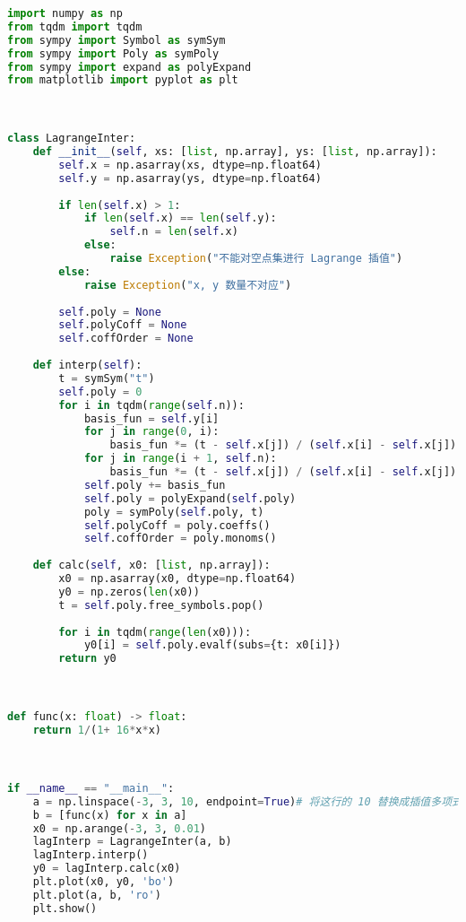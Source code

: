 \begin{lstlisting}[language=python]
import numpy as np
from tqdm import tqdm
from sympy import Symbol as symSym
from sympy import Poly as symPoly
from sympy import expand as polyExpand
from matplotlib import pyplot as plt



class LagrangeInter:
    def __init__(self, xs: [list, np.array], ys: [list, np.array]):
        self.x = np.asarray(xs, dtype=np.float64)
        self.y = np.asarray(ys, dtype=np.float64)
        
        if len(self.x) > 1:
            if len(self.x) == len(self.y):
                self.n = len(self.x)
            else:
                raise Exception("不能对空点集进行 Lagrange 插值")
        else:
            raise Exception("x, y 数量不对应")
        
        self.poly = None
        self.polyCoff = None
        self.coffOrder = None
    
    def interp(self):
        t = symSym("t")
        self.poly = 0
        for i in tqdm(range(self.n)):
            basis_fun = self.y[i]
            for j in range(0, i):
                basis_fun *= (t - self.x[j]) / (self.x[i] - self.x[j])
            for j in range(i + 1, self.n):
                basis_fun *= (t - self.x[j]) / (self.x[i] - self.x[j])
            self.poly += basis_fun
            self.poly = polyExpand(self.poly)
            poly = symPoly(self.poly, t)
            self.polyCoff = poly.coeffs()
            self.coffOrder = poly.monoms()
    
    def calc(self, x0: [list, np.array]):
        x0 = np.asarray(x0, dtype=np.float64)
        y0 = np.zeros(len(x0))
        t = self.poly.free_symbols.pop()
        
        for i in tqdm(range(len(x0))):
            y0[i] = self.poly.evalf(subs={t: x0[i]})
        return y0



def func(x: float) -> float:
    return 1/(1+ 16*x*x)



if __name__ == "__main__":
    a = np.linspace(-3, 3, 10, endpoint=True)# 将这行的 10 替换成插值多项式的选点数量（即阶数）
    b = [func(x) for x in a]
    x0 = np.arange(-3, 3, 0.01)
    lagInterp = LagrangeInter(a, b)
    lagInterp.interp()
    y0 = lagInterp.calc(x0)
    plt.plot(x0, y0, 'bo')
    plt.plot(a, b, 'ro')
    plt.show()
\end{lstlisting}

